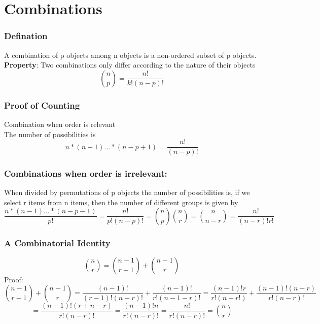 \documentclass{article}
\begin{document}
\section{Combinations}
\subsubsection{Defination}
A combination of p objects among n objects is a non-ordered subset of p objects. \\
\textbf{Property}: Two combinations only differ according to the nature of their objects 
\begin{equation}
    \binom{n}{p}=\frac{n!}{k!(n-p)!}
\end{equation}
\subsubsection*{Proof of Counting}
Combination when order is relevant\\
The number of possibilities is 
\begin{equation}
    n*(n-1)\ldots*(n-p+1)= \frac{n!}{(n-p)!}
\end{equation}
\subsubsection{Combinations when order is irrelevant:}
When divided by  permutations of p objects the number of possibilities is, if we select r items from n items, then the number of different groups is given by 
\begin{equation}
    \frac{n*(n-1)\ldots*(n-p-1)}{p!} = \frac{n!}{p!(n-p)!} = \binom{n}{p}
    \binom{n}{r}= \binom{n}{n-r}= \frac{n!}{(n-r)!r!}
\end{equation}
\subsubsection{A Combinatorial Identity}
\begin{equation}
    \binom{n}{r}= \binom{n-1}{r-1}+\binom{n-1}{r}
\end{equation}
Proof:
\begin{equation}
    \binom{n-1}{r-1}+\binom{n-1}{r}= \frac{(n-1)!}{(r-1)!(n-r)!}+\frac{(n-1)!}{r!(n-1-r)!}= \frac{(n-1)!r}{r!(n-r!)}+\frac{(n-1)!(n-r)}{r!(n-r)!}
\end{equation}
\begin{equation}
    =\frac{(n-1)!(r+n-r)}{r!(n-r)!}= \frac{(n-1)!n}{r!(n-r)!}= \frac{n!}{r!(n-r)!}= \binom{n}{r}
\end{equation}
\end{document}
